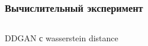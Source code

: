\documentclass[8pt]{beamer}
\begin{document}
\begin{frame}
	\frametitle{Вычислительный эксперимент}
	\begin{columns}
		\begin{column}{0.8\textwidth}
			\begin{block}{DDGAN с wasserstein distance}
				\begin{figure}[H]
				\end{figure}
			\end{block}
		\end{column}
		\begin{column}{0.23\textwidth}
			\begin{figure}[H]
				

\end{figure}
\end{column}
\end{columns}
\end{frame}
\end{document}
